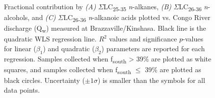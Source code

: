 \begin{figure}[p]
	\caption[Correlation between compound-class contribution and discharge]{Fractional contribution by \textit{(A)} $\Sigma$LC\textsubscript{25-35} \textit{n}-alkanes, \textit{(B)} $\Sigma$LC\textsubscript{26-36} \textit{n}-alcohols, and \textit{(C)} $\Sigma$LC\textsubscript{26-36} \textit{n}-alkanoic acids plotted vs. Congo River discharge (Q\textsubscript{w}) measured at Brazzaville/Kinshasa. Black line is the quadratic WLS regression line. $R^2$ values and significance $p$-values for linear ($\beta_1$) and quadratic ($\beta_2$) parameters are reported for each regression. Samples collected when f\textsubscript{south} > 39\% are plotted as white squares, and samples collected when f\textsubscript{south} $\leq$ 39\% are plotted as black circles. Uncertainty ($\pm 1 \sigma$) is smaller than the symbols for all data points.}
	\label{Ch4Fig:10} 
\end{figure}

